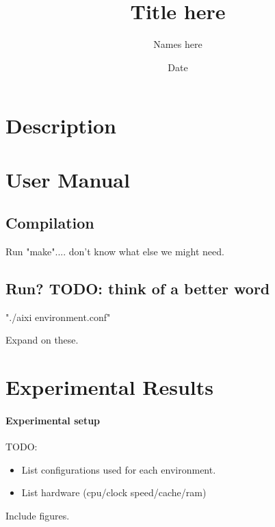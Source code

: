 \documentclass{article}
\title{Title here}
\author{Names here}
\date{Date}
\begin{document}
\maketitle

\section{Description}

\section{User Manual}
\subsection{Compilation}
Run "make".... don't know what else we might need.

\subsection{Run? TODO: think of a better word}
"./aixi environment.conf"

Expand on these.

\section{Experimental Results}
\paragraph{Experimental setup}
TODO:
\begin{itemize}
    \item List configurations used for each environment.
    \item List hardware (cpu/clock speed/cache/ram)
\end{itemize}

Include figures.
\end{document}
